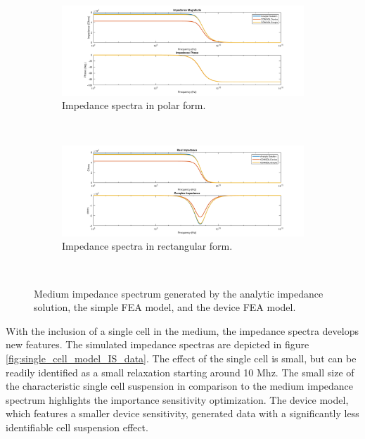 \begin{figure}[H]
    \centering
    \begin{subfigure}[b]{\textwidth}
        \centering
        \includegraphics[width=\textwidth]{images/IS_model_medium_mag_phase.png}
        \caption{Impedance spectra in polar form.}
    \end{subfigure}
    \\
    \vspace{0.1 in}
    \begin{subfigure}[b]{\textwidth}
        \centering
        \includegraphics[width=\textwidth]{images/IS_model_medium_real_imag.png}
        \caption{Impedance spectra in rectangular form.}
    \end{subfigure}
    \\
    \vspace{0.1 in}
    \caption[Analyitic and FEA generated medium impedance spectrum]{Medium impedance spectrum generated by the analytic impedance solution, the simple FEA model, and the device FEA model.}
    \label{fig:medium_model_IS_data}
\end{figure}

\par With the inclusion of a single cell in the medium, the impedance spectra develops new features. The simulated impedance spectras are depicted in figure \ref{fig:single_cell_model_IS_data}. The effect of the single cell is small, but can be readily identified as a small relaxation starting around 10 Mhz. The small size of the characteristic single cell suspension in comparison to the medium impedance spectrum highlights the importance sensitivity optimization. The device model, which features a smaller device sensitivity, generated data with a significantly less identifiable cell suspension effect. 

